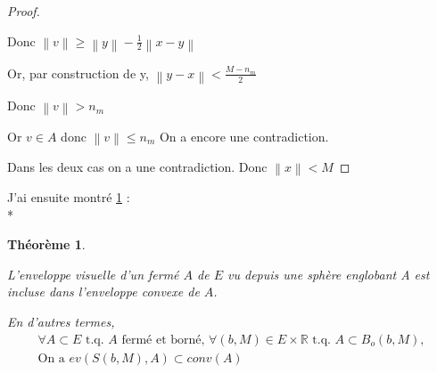\documentclass[a4paper]{article}
\newcommand{\norm}[1]{\left\lVert#1\right\rVert}
\newtheorem{theo}{Théorème}
\begin{document}
\begin{proof}
\begin{itemize}
    Donc $\norm{v} \geqslant \norm{y} - \frac{1}{2} \norm{x - y}$

    Or, par construction de y, $\norm{y - x} < \frac{M - n_{m}}{2}$

    Donc $\norm{v} > n_{m}$

    Or $v \in A$  donc $\norm{v} \leqslant n_{m}$
    On a encore une contradiction.
    \end{itemize}

    \medskip

    Dans les deux cas on a une contradiction.
    Donc $\norm{x} < M$
    \end{proof}

    \bigskip

    J'ai ensuite montré \ref{th1} :\\*
    \begin{theo}\label{th1}

    L'enveloppe visuelle d'un fermé $A$ de $E$ vu depuis une sphère englobant A est incluse dans l'enveloppe convexe de $A$.

    En d'autres termes, 
    \begin{gather*}
    \forall A \subset E \text{ t.q. $A$ fermé et borné, } \forall (b, M) \in E \times \mathbb{R} \text{ t.q. } A \subset B_{o}(b, M), \\
    \text{On a } ev(S(b, M), A) \subset conv(A)
    \end{gather*}
    \end{theo}
\end{document}

